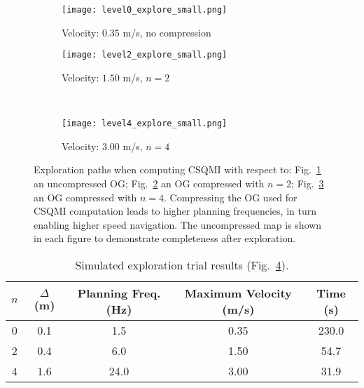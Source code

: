 \begin{figure}
    \centering
    \begin{subfigure}[t]{0.48\textwidth}
        \centering
        \texttt{[image: level0\_explore\_small.png]}
        \caption{Velocity: $0.35$ m/s, no compression
        \label{fig:pri_result3_a}}
    \end{subfigure}
    \hfill
    \begin{subfigure}[t]{0.48\textwidth}
        \centering
        \texttt{[image: level2\_explore\_small.png]}
        \caption{Velocity: $1.50$ m/s, $n=2$
        \label{fig:pri_result3_b}}
    \end{subfigure}
    \\
    \begin{subfigure}[t]{0.48\textwidth}
        \centering
        \texttt{[image: level4\_explore\_small.png]}
        \caption{Velocity: $3.00$ m/s, $n=4$
        \label{fig:pri_result3_c}}
    \end{subfigure}
    \caption[Simulated exploration trials with map compression.]{Exploration paths when computing CSQMI with respect
    to: Fig.~\ref{fig:pri_result3_a} an uncompressed OG; Fig.~\ref{fig:pri_result3_b} an
OG compressed with $n=2$; Fig.~\ref{fig:pri_result3_c} an OG compressed with $n=4$.
Compressing the OG used for CSQMI computation leads to higher planning
frequencies, in turn enabling higher speed navigation. The uncompressed map is
shown in each figure to demonstrate completeness after exploration.
\label{fig:pri_result3}}
\end{figure}

\begin{table}[t]
  \caption{Simulated exploration trial results
  (Fig.~\ref{fig:pri_result3}).\label{tab:pri_result_table}}
  \centering
  \begin{tabular}{| c | c | c | c | c |}
    \hline
    $n$ & {$\Delta$} (m) & Planning Freq. (Hz) &
            Maximum Velocity (m/s) & Time (s) \\ \hline
                                 0 & 0.1 & 1.5 & 0.35 & 230.0 \\ \hline
                                 2 & 0.4 & 6.0 & 1.50 & 54.7 \\ \hline
                                 4 & 1.6 & 24.0 & 3.00 & 31.9 \\ \hline
  \end{tabular}
\end{table}

\clearpage

